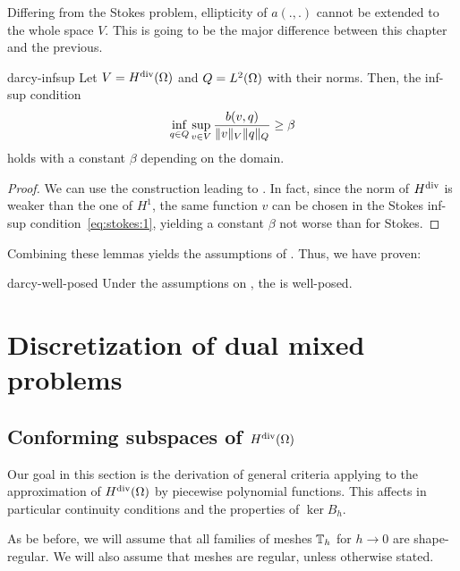 \begin{remark}
  Differing from the Stokes problem, ellipticity of $a(.,.)$ cannot be
  extended to the whole space $V$. This is going to be the major
  difference between this chapter and the previous.
\end{remark}

\begin{Lemma}{darcy-infsup}
  Let $V=H^{\text{div}}(\Omega)$ and $Q=L^2(\Omega)$ with their norms.  Then,
  the inf-sup condition
  \begin{gather}
    \inf_{q\in Q} \sup_{v\in V} \frac{b(v,q)}{\lVert v\rVert_V\lVert q\rVert_Q}
    \ge \beta
  \end{gather}
  holds with a constant $\beta$ depending on the domain.
\end{Lemma}

\begin{proof}
  We can use the construction leading to
  . In fact, since the norm of $H^{\text{div}}$
  is weaker than the one of $H^1$, the same function $v$ can be chosen
  in the Stokes inf-sup condition~\eqref{eq:stokes:1}, yielding a
  constant $\beta$ not worse than for Stokes.
\end{proof}

Combining these lemmas yields the assumptions of
. Thus, we have proven:

\begin{Theorem}{darcy-well-posed}
  Under the assumptions on ,
  the  is well-posed.
\end{Theorem}

\section{Discretization of dual mixed problems}

\subsection{Conforming subspaces of $H^{\text{div}}(\Omega)$}

\begin{intro}
  Our goal in this section is the derivation of general criteria
  applying to the approximation of $H^{\text{div}}(\Omega)$ by piecewise
  polynomial functions. This affects in particular continuity
  conditions and the properties of $\ker{B_h}$.

  As be before, we will assume that all families of meshes $\mathbb T_h$
  for $h\to 0$ are shape-regular. We will also assume that meshes are
  regular, unless otherwise stated.
\end{intro}


